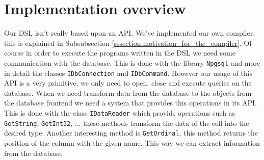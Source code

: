 
\section{Implementation overview}
Our DSL isn't really based upon an API. We've implemented our own compiler, this is explained in Subsubsection \ref{sssection:motivation_for_the_compiler}. Of course in order to execute the programs written in the DSL we need some communication with the database. This is done with the library \texttt{Npgsql} and more in detail the classes \texttt{IDbConnection} and \texttt{IDbCommand}. However our usage of this API is a very primitive, we only need to open, close and execute queries on the database. When we need transform data from the database to the objects from the database frontend we need a system that provides this operations in its API. This is done with the class \texttt{IDataReader} which provids operations such as \texttt{GetString}, \texttt{GetInt32}, ... these methods transform the data of the cell into the desired type. Another interesting method is \texttt{GetOrdinal}, this method returns the position of the column with the given name. This way we can extract information from the database.